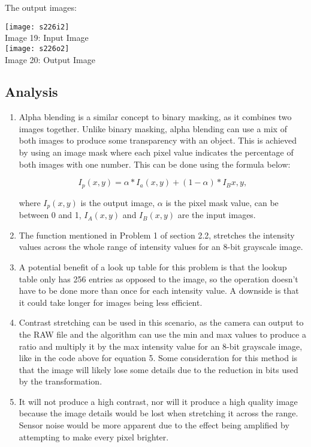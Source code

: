 \documentclass{article}
\begin{document}
	The output images:\\
	
	\begin{center}
		\noindent \texttt{[image: s226i2]}\\
		Image 19: Input Image\\
		\texttt{[image: s226o2]}\\
		Image 20: Output Image\\
	\end{center}
	
	\subsection{Analysis}
	
	\begin{enumerate}
		\item Alpha blending is a similar concept to binary masking, as it combines two images together. Unlike binary masking, alpha blending can use a mix of both images to produce some transparency with an object. This is achieved by using an image mask where each pixel value indicates the percentage of both images with one number. This can be done using the formula below: 
		
		\begin{equation}
		I_{p}(x,y) = \alpha * I_{a}(x,y) + (1 - \alpha) * I_{B}{x,y},
		\end{equation}
		
		where $ I_{p}(x,y) $ is the output image, $ \alpha  $ is the pixel mask value, can be between 0 and 1, $ I_{A}(x,y) $ and $ I_{B}(x,y) $ are the input images.
		
		\item The function mentioned in Problem 1 of section 2.2, stretches the intensity values across the whole range of intensity values for an 8-bit grayscale image.
		
		\item A potential benefit of a look up table for this problem is that the lookup table only has 256 entries as opposed to the image, so the operation doesn't have to be done more than once for each intensity value. A downside is that it could take longer for images being less efficient.
		
		\item Contrast stretching can be used in this scenario, as the camera can output to the RAW file and the algorithm can use the min and max values to produce a ratio and multiply it by the max intensity value for an 8-bit grayscale image, like in the code above for equation 5. Some consideration for this method is that the image will likely lose some details due to the reduction in bits used by the transformation.
		
		\item It will not produce a high contrast, nor will it produce a high quality image because the image details would be lost when stretching it across the range. Sensor noise would be more apparent due to the effect being amplified by attempting to make every pixel brighter.
	\end{enumerate}
	
\end{document}
